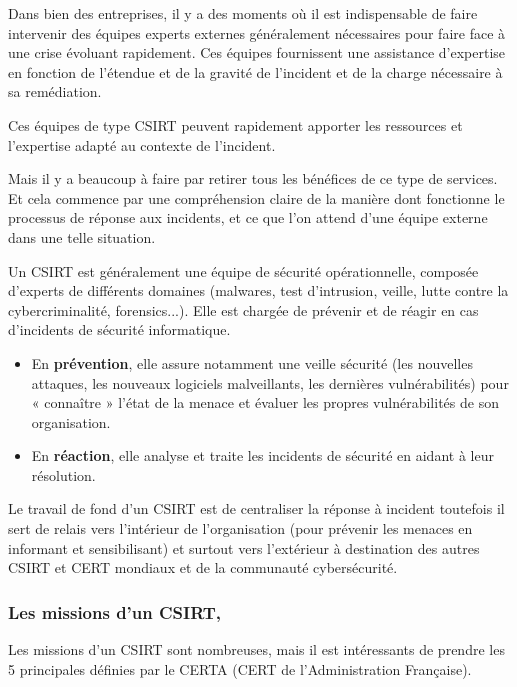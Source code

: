 Dans bien des entreprises, il y a des moments où il est indispensable de faire intervenir des équipes experts externes généralement nécessaires pour faire face à une crise évoluant rapidement. Ces équipes fournissent une assistance d'expertise en fonction de l’étendue et de la gravité de l’incident et de la charge nécessaire à sa remédiation.

Ces équipes de type CSIRT peuvent rapidement apporter les ressources et l’expertise adapté au contexte de l'incident.

 Mais il y a beaucoup à faire par retirer tous les bénéfices de ce type de services. Et cela commence par une compréhension claire de la manière dont fonctionne le processus de réponse aux incidents, et ce que l’on attend d’une équipe externe dans une telle situation.
 
 
 Un CSIRT est généralement une équipe de sécurité opérationnelle, composée d’experts de différents domaines (malwares, test d’intrusion, veille, lutte contre la cybercriminalité, forensics...). Elle est chargée de prévenir et de réagir en cas d’incidents de sécurité informatique.
\begin{itemize}
  \item En \textbf{prévention}, elle assure notamment une veille sécurité (les nouvelles attaques, les nouveaux logiciels malveillants, les dernières vulnérabilités) pour « connaître » l’état de la menace et évaluer les propres vulnérabilités de son organisation.
  \item En \textbf{réaction}, elle analyse et traite les incidents de sécurité en aidant à leur résolution.
\end{itemize}

Le travail de fond d'un CSIRT est de centraliser la réponse à incident toutefois il sert de relais vers l’intérieur de l’organisation (pour prévenir les menaces en informant et sensibilisant) et surtout vers l’extérieur à destination des autres CSIRT et CERT mondiaux et de la communauté cybersécurité.
 
  \subsubsection{Les missions d’un CSIRT,}
 Les missions d’un CSIRT sont nombreuses, mais il est intéressants de prendre les 5 principales définies par le CERTA (CERT de l'Administration Française).

